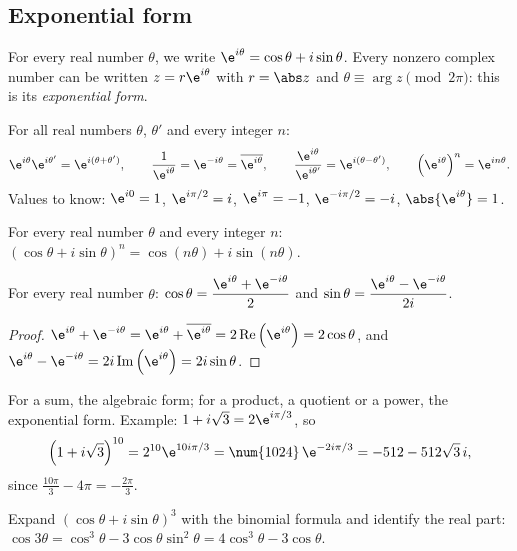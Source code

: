 \subsection{Exponential form}
\begin{definition}
For every real number $\theta$, we write $\e^{i\theta}=\cos\theta+i\sin\theta$. Every nonzero complex number can be written $z=r\e^{i\theta}$ with $r=\abs z$ and $\theta\equiv\arg z\pmod{2\pi}$: this is its \emph{exponential form}.
\end{definition}
\begin{theorem}
For all real numbers $\theta$, $\theta'$ and every integer $n$:
\[\e^{i\theta}\e^{i\theta'}=\e^{i(\theta+\theta')},\qquad\frac1{\e^{i\theta}}=\e^{-i\theta}=\overline{\e^{i\theta}},\qquad\frac{\e^{i\theta}}{\e^{i\theta'}}=\e^{i(\theta-\theta')},\qquad\left(\e^{i\theta}\right)^n=\e^{in\theta}.\]
Values to know: $\e^{i0}=1$, $\e^{i\pi/2}=i$, $\e^{i\pi}=-1$, $\e^{-i\pi/2}=-i$, $\abs{\e^{i\theta}}=1$.
\end{theorem}
\begin{theorem}
For every real number $\theta$ and every integer $n$: $(\cos\theta+i\sin\theta)^n=\cos(n\theta)+i\sin(n\theta)$.
\end{theorem}
\begin{theorem}
For every real number $\theta$: $\cos\theta=\dfrac{\e^{i\theta}+\e^{-i\theta}}2$ and $\sin\theta=\dfrac{\e^{i\theta}-\e^{-i\theta}}{2i}$.
\end{theorem}
\begin{proof}
$\e^{i\theta}+\e^{-i\theta}=\e^{i\theta}+\overline{\e^{i\theta}}=2\operatorname{Re}\left(\e^{i\theta}\right)=2\cos\theta$, and $\e^{i\theta}-\e^{-i\theta}=2i\operatorname{Im}\left(\e^{i\theta}\right)=2i\sin\theta$.
\end{proof}
\begin{method}
For a sum, the algebraic form; for a product, a quotient or a power, the exponential form. Example: $1+i\sqrt3=2\e^{i\pi/3}$, so
\[\left(1+i\sqrt3\right)^{10}=2^{10}\e^{10i\pi/3}=\num{1024}\,\e^{-2i\pi/3}=-512-512\sqrt3\,i,\]
since $\frac{10\pi}3-4\pi=-\frac{2\pi}3$.
\end{method}
\begin{method}
Expand $(\cos\theta+i\sin\theta)^3$ with the binomial formula and identify the real part:
$\cos3\theta=\cos^3\theta-3\cos\theta\sin^2\theta=4\cos^3\theta-3\cos\theta$.
\end{method}
